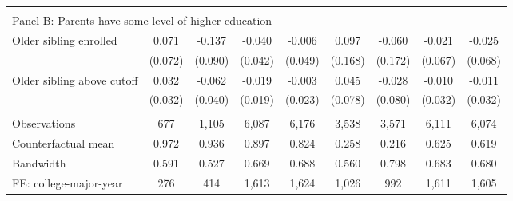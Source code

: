 {{\begin{tabular}{lcccccccc}
&  &  &  & & & & & &    \\
\multicolumn{9}{l}{Panel B: Parents have some level of higher education} \\
Older sibling enrolled&       0.071   &      -0.137   &      -0.040   &      -0.006   &       0.097   &      -0.060   &      -0.021   &      -0.025   \\
                    &     (0.072)   &     (0.090)   &     (0.042)   &     (0.049)   &     (0.168)   &     (0.172)   &     (0.067)   &     (0.068)   \\
 
Older sibling above cutoff&       0.032   &      -0.062   &      -0.019   &      -0.003   &       0.045   &      -0.028   &      -0.010   &      -0.011   \\
                    &     (0.032)   &     (0.040)   &     (0.019)   &     (0.023)   &     (0.078)   &     (0.080)   &     (0.032)   &     (0.032)   \\
                    &               &               &               &               &               &               &               &               \\
Observations        &         677   &       1,105   &       6,087   &       6,176   &       3,538   &       3,571   &       6,111   &       6,074   \\
Counterfactual mean &       0.972   &       0.936   &       0.897   &       0.824   &       0.258   &       0.216   &       0.625   &       0.619   \\
Bandwidth           &       0.591   &       0.527   &       0.669   &       0.688   &       0.560   &       0.798   &       0.683   &       0.680   \\
FE: college-major-year&         276   &         414   &       1,613   &       1,624   &       1,026   &         992   &       1,611   &       1,605   \\
 

\bottomrule
\end{tabular}
}
}
